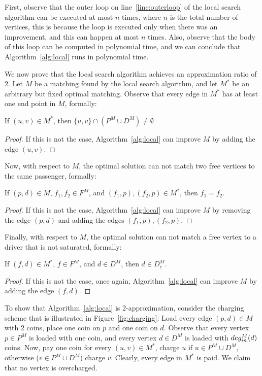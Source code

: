 First, observe that the outer loop on line~\ref{line:outerloop} of the local search algorithm
can be executed at most $n$ times, 
where $n$ is the total number of vertices, 
this is because the loop is executed only when there was an improvement, 
and this can happen at most $n$ times.
Also, observe that the body of this loop can be computed in polynomial time, 
and we can conclude that Algorithm~\ref{alg:local} runs in polynomial time.
    
We now prove that the local search algorithm achieves an approximation ratio of $2$.
Let $M$ be a matching found by the local search algorithm, 
and let $M^*$ be an arbitrary but fixed optimal matching.
Observe that every edge in $M^*$ has at least one end point in $M$, formally: 
\begin{observation}
If $(u,v) \in M^*$, then $\{u,v\} \cap (P^M \cup D^M) \neq \emptyset$
\end{observation}

\begin{proof}
If this is not the case, Algorithm~\ref{alg:local} can improve $M$
by adding the edge $(u,v)$.  
\end{proof}

Now, with respect to $M$, the optimal solution can not match two free vertices to the same
passenger, formally:
\begin{observation}
\label{observation:one-free}
If $(p,d) \in M$, $f_1, f_2 \in F^M$, and $(f_1, p), (f_2, p) \in M^*$, then $f_1 = f_2$.
\end{observation}

\begin{proof}
If this is not the case, Algorithm~\ref{alg:local} can improve $M$ 
by removing the edge $(p,d)$ and adding the edges $(f_1, p), (f_2, p)$.
\end{proof}

Finally, with respect to $M$, the optimal solution can not match a free vertex to a driver
that is not saturated, formally: 
\begin{observation}
\label{observation:saturated}
If $(f,d) \in M^*$, $f \in F^M$, and $d \in D^M$, then $d \in D^M_c$.
\end{observation}

\begin{proof}
If this is not the case, once again, Algorithm~\ref{alg:local} can improve $M$
by adding the edge $(f,d)$.
\end{proof}

To show that Algorithm~\ref{alg:local} is 2-approximation, 
consider the charging scheme that is illustrated in Figure~\ref{fig:charging}:
Load every edge $(p,d) \in M$ with 2 coins, 
place one coin on $p$ and one coin on $d$.
Observe that every vertex $p \in P^M$ is loaded with one coin, 
and every vertex $d \in D^M$ is loaded with $deg^M_{in}(d)$ coins.   
Now, pay one coin for every $(u,v) \in M^*$, charge $u$ if $u \in P^M \cup D^M$, 
otherwise ($v \in P^M \cup D^M$) charge $v$.
Clearly, every edge in $M^*$ is paid.
We claim that no vertex is overcharged.

